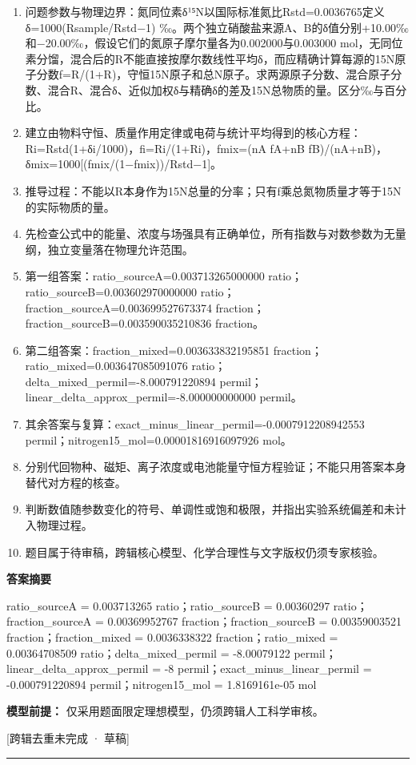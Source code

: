 \documentclass[UTF8,11pt,a4paper]{ctexart}
\begin{document}
\begin{enumerate}
\item 问题参数与物理边界：氮同位素δ¹⁵N以国际标准氮比Rstd=0.0036765定义δ=1000(Rsample/Rstd−1) ‰。两个独立硝酸盐来源A、B的δ值分别+10.00‰和−20.00‰，假设它们的氮原子摩尔量各为0.002000与0.003000 mol，无同位素分馏，混合后的R不能直接按摩尔数线性平均δ，而应精确计算每源的15N原子分数f=R/(1+R)，守恒15N原子和总N原子。求两源原子分数、混合原子分数、混合R、混合δ、近似加权δ与精确δ的差及15N总物质的量。区分‰与百分比。
\item 建立由物料守恒、质量作用定律或电荷与统计平均得到的核心方程：Ri=Rstd(1+δi/1000)，fi=Ri/(1+Ri)，fmix=(nA fA+nB fB)/(nA+nB)，δmix=1000[(fmix/(1−fmix))/Rstd−1]。
\item 推导过程：不能以R本身作为15N总量的分率；只有f乘总氮物质量才等于15N的实际物质的量。
\item 先检查公式中的能量、浓度与场强具有正确单位，所有指数与对数参数为无量纲，独立变量落在物理允许范围。
\item 第一组答案：ratio\_sourceA=0.003713265000000 ratio；ratio\_sourceB=0.003602970000000 ratio；fraction\_sourceA=0.003699527673374 fraction；fraction\_sourceB=0.003590035210836 fraction。
\item 第二组答案：fraction\_mixed=0.003633832195851 fraction；ratio\_mixed=0.003647085091076 ratio；delta\_mixed\_permil=-8.000791220894 permil；linear\_delta\_approx\_permil=-8.000000000000 permil。
\item 其余答案与复算：exact\_minus\_linear\_permil=-0.0007912208942553 permil；nitrogen15\_mol=0.00001816916097926 mol。
\item 分别代回物种、磁矩、离子浓度或电池能量守恒方程验证；不能只用答案本身替代对方程的核查。
\item 判断数值随参数变化的符号、单调性或饱和极限，并指出实验系统偏差和未计入物理过程。
\item 题目属于待审稿，跨辑核心模型、化学合理性与文字版权仍须专家核验。
\end{enumerate}
\noindent\textbf{答案摘要}\par
ratio\_sourceA = 0.003713265 ratio；ratio\_sourceB = 0.00360297 ratio；fraction\_sourceA = 0.00369952767 fraction；fraction\_sourceB = 0.00359003521 fraction；fraction\_mixed = 0.0036338322 fraction；ratio\_mixed = 0.00364708509 ratio；delta\_mixed\_permil = -8.00079122 permil；linear\_delta\_approx\_permil = -8 permil；exact\_minus\_linear\_permil = -0.000791220894 permil；nitrogen15\_mol = 1.8169161e-05 mol\par
\noindent\textbf{模型前提：}
仅采用题面限定理想模型，仍须跨辑人工科学审核。\par
\noindent\textcolor{red!65!black}{[跨辑去重未完成 · 草稿]} \par
\medskip\hrule\medskip
\end{document}
